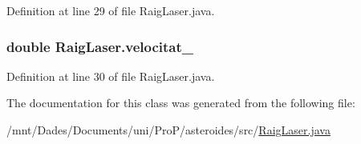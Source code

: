 Definition at line 29 of file Raig\+Laser.\+java.

\hypertarget{class_raig_laser_a825787d7b0ce038d9ad4c9ef6013f7b9}{}
\subsubsection[{velocitat\+\_\+}]{\setlength{\rightskip}{0pt plus 5cm}double Raig\+Laser.\+velocitat\+\_\+\hspace{0.3cm}{\ttfamily [private]}}\label{class_raig_laser_a825787d7b0ce038d9ad4c9ef6013f7b9}


Definition at line 30 of file Raig\+Laser.\+java.



The documentation for this class was generated from the following file\+:\begin{DoxyCompactItemize}
\item 
/mnt/\+Dades/\+Documents/uni/\+Pro\+P/asteroides/src/\hyperlink{_raig_laser_8java}{Raig\+Laser.\+java}\end{DoxyCompactItemize}
